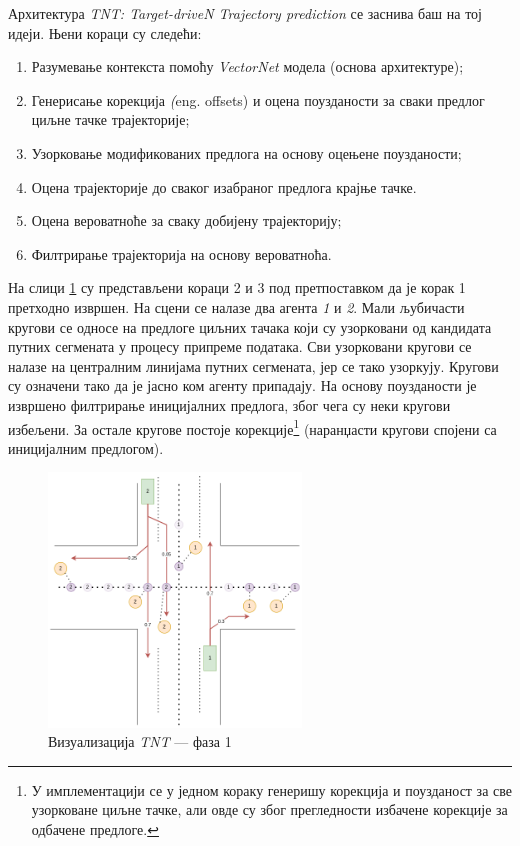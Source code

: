 \documentclass[11pt,oneside]{memoir}
\begin{document}
Архитектура \textit{TNT: Target-driveN Trajectory prediction} \cite{tnt} се заснива баш на тој идеји. Њени кораци су следећи:
\begin{enumerate}
  \item Разумевање контекста помоћу \textit{VectorNet} модела (основа архитектуре);
  \item Генерисање корекција \textit(eng. offsets) и оцена поузданости за сваки предлог циљне тачке трајекторије;
  \item Узорковање модификованих предлога на основу оцењене поузданости;
  \item Оцена трајекторије до сваког изабраног предлога крајње тачке.
  \item Оцена вероватноће за сваку добијену трајекторију;
  \item Филтрирање трајекторија на основу вероватноћа.
\end{enumerate}

На слици \ref{tnt-viz-1} су представљени кораци 2 и 3 под претпоставком да је корак 1 претходно извршен. На сцени се налазе два агента
\textit{1} и \textit{2}. Мали љубичасти кругови се односе на предлоге циљних тачака који су узорковани од кандидата путних сегмената у процесу припреме података.
Сви узорковани кругови се налазе на централним линијама путних сегмената, јер се тако узоркују. Кругови су означени тако да је јасно ком агенту припадају. На основу поузданости је 
извршено филтрирање иницијалних предлога, због чега су неки кругови избељени. За остале кругове постоје корекције\footnote{
  У имплементацији се у једном кораку генеришу корекција и поузданост за све узорковане циљне тачке, али овде су због прегледности
  избачене корекције за одбачене предлоге.
} (наранџасти кругови спојени са иницијалним предлогом).


\begin{figure}[H]
  \centering
  \includegraphics[width=0.6\textwidth]{images/tnt-viz-Page-1.drawio.png}
  \caption{Визуализација \textit{TNT} --- фаза 1 \label{tnt-viz-1}}
\end{figure}
\end{document}
